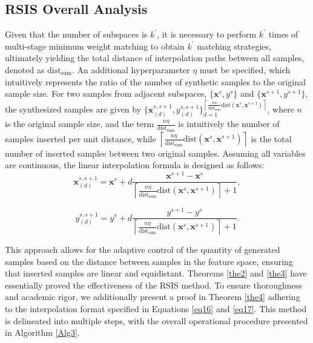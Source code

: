\documentclass[final,3p,times]{elsarticle}
\begin{document}
\subsection{RSIS Overall Analysis}
Given that the number of subspaces is $k^\prime$, it is necessary 
to perform $k^\prime$ times of multi-stage minimum weight matching 
to obtain $k^\prime$ matching strategies, ultimately yielding 
the total distance of interpolation paths between all samples, 
denoted as $\text{dist}_{\text{sum}}$. An additional 
hyperparameter $\eta$ must be specified, which intuitively 
represents the ratio of the number of synthetic samples to the 
original sample size. For two samples from adjacent subspaces, 
$\{\boldsymbol{x}^s,y^s\}$ and $\{\boldsymbol{x}^{s+1},y^{s+1}\}$, 
the synthesized samples are given by $\{\boldsymbol{x}_{(d)}^
{s,s+1},y_{(d)}^{s,s+1} \}_{d=1}^{\left\lceil \frac{n\eta }
{\text{dist}_{\text{sum}}}\text{dist}(\boldsymbol{x}^s,
\boldsymbol{x}^{s+1})\right\rceil}$, where $n$ is the original 
sample size, and the term $\frac{n\eta}{\text{dist}_{\text{sum}}}$
 is intuitively the number of samples inserted per unit distance, 
 while $\left\lceil \frac{n\eta}{\text{dist}_{\text{sum}}}
 \text{dist}(\boldsymbol{x}^s,\boldsymbol{x}^{s+1})\right\rceil$ 
 is the total number of inserted samples between two original 
 samples. Assuming all variables are continuous, 
 the linear interpolation formula is designed as follows:
\begin{equation}
\label{eq16}
\boldsymbol{x}^{s,s+1}_{(d)}=\boldsymbol{x}^s+d\dfrac
{\boldsymbol{x}^{s+1}-\boldsymbol{x}^{s}}{\left\lceil 
\frac{n\eta}{\text{dist}_{\text{sum}}}\text{dist}
(\boldsymbol{x}^s,\boldsymbol{x}^{s+1})\right\rceil+1},
\end{equation}

\begin{equation}
\label{eq17}
y^{s,s+1}_{(d)}=y^s+d\dfrac{y^{s+1}-y^{s}}{\left\lceil 
\frac{n\eta}{\text{dist}_{\text{sum}}}\text{dist}
(\boldsymbol{x}^s,\boldsymbol{x}^{s+1})\right\rceil+1}.
\end{equation}



This approach allows for the adaptive control of the quantity of 
generated samples based on the distance between samples in the 
feature space, ensuring that inserted samples are linear and 
equidistant. Theorems \ref{the2} and \ref{the3} 
have essentially proved the effectiveness of the RSIS method. 
To ensure thoroughness and academic rigor, we additionally 
present a proof in Theorem \ref{the4} adhering to the interpolation 
format specified in Equations \eqref{eq16} and \eqref{eq17}. This method is delineated into multiple steps, with the overall 
operational procedure presented in Algorithm \ref{Alg3}.
\end{document}
